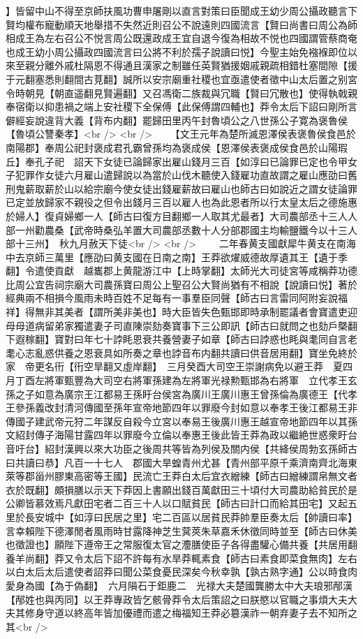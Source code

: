 】皆留中山不得至京師扶風功曹申屠剛以直言對策曰臣聞成王幼少周公攝政聽言下賢均權布寵動順天地舉措不失然近則召公不說遠則四國流言【賢曰尚書曰周公為師相成王為左右召公不悦言周公既還政成王宜自退今復為相故不悦也四國謂管蔡商奄也成王幼小周公攝政四國流言曰公將不利於孺子說讀曰悦】今聖主始免襁褓即位以來至親分離外戚杜隔恩不得通且漢家之制雖任英賢猶援姻戚親疏相錯杜塞間隙【援于元翻塞悉則翻間古莧翻】誠所以安宗廟重社稷也宜亟遣使者徵中山太后置之别宮令時朝見【朝直遥翻見賢遍翻】又召馮衛二族裁與冗職【賢曰冗散也】使得執戟親奉宿衛以抑患禍之端上安社稷下全保傅【此保傅謂四輔也】莽令太后下詔曰剛所言僻經妄說違背大義【背布内翻】罷歸田里丙午封魯頃公之八世孫公子寛為褒魯侯【魯頃公讐秦孝】<br />
<br />
　　【文王元年為楚所滅恩澤侯表褒魯侯食邑於南陽郡】奉周公祀封褒成君孔霸曾孫均為褒成侯【恩澤侯表褒成侯食邑於山陽瑕丘】奉孔子祀　詔天下女徒已論歸家出雇山錢月三百【如淳曰已論罪已定也令甲女子犯罪作女徒六月雇山遣歸說以為當於山伐木聽使入錢雇功直故謂之雇山應劭曰舊刑鬼薪取薪於山以給宗廟今使女徒出錢雇薪故曰雇山也師古曰如說近之謂女徒論罪已定並放歸家不親役之但令出錢月三百以雇人也為此恩者所以行太皇太后之德施惠於婦人】復貞婦鄉一人【師古曰復方目翻鄉一人取其尤最者】大司農部丞十三人人部一州勸農桑【武帝時桑弘羊置大司農部丞數十人分部郡國主均輸鹽鐵今以十三人部十三州】　秋九月赦天下徒<br />
<br />
　　二年春黄支國獻犀牛黄支在南海中去京師三萬里【應劭曰黄支國在日南之南】王莽欲燿威德故厚遺其王【遺于季翻】令遣使貢獻　越巂郡上黄龍游江中【上時掌翻】太師光大司徒宮等咸稱莽功德比周公宜告祠宗廟大司農孫寶曰周公上聖召公大賢尚猶有不相說【說讀曰悦】著於經典兩不相損今風雨未時百姓不足每有一事羣臣同聲【師古曰言雷同阿附妄說福祥】得無非其美者【謂所美非美也】時大臣皆失色甄邯即時承制罷議者會寶遣吏迎母母道病留弟家獨遣妻子司直陳崇劾奏寶事下三公即訊【師古曰就問之也劾戶槩翻下遐稼翻】寶對曰年七十誖眊恩衰共養營妻子如章【師古曰誖惑也眊與耄同自言老耄心志亂惑供養之恩衰具如所奏之章也誖音布内翻共讀曰供音居用翻】寶坐免終於家　帝更名衎【衎空旱翻又虛岸翻】　三月癸酉大司空王崇謝病免以避王莽　夏四月丁酉左將軍甄豐為大司空右將軍孫建為左將軍光禄勲甄邯為右將軍　立代孝王玄孫之子如意為廣宗王江都易王孫盱台侯宮為廣川王廣川惠王曾孫倫為廣德王【代孝王參孫義改封清河傳國至孫年宣帝地節四年以罪廢今封如意以奉孝王後江都易王非傳國子建武帝元狩二年謀反自殺今立宮以奉易王後廣川惠王越宣帝地節四年以其孫文紹封傳子海陽甘露四年以罪廢今立倫以奉惠王後此皆王莽為政以繼絶世惑衆盱台音吁台】紹封漢興以來大功臣之後周共等皆為列侯及關内侯【共絳侯周勃玄孫師古曰共讀曰恭】凡百一十七人　郡國大旱蝗青州尤甚【青州部平原千乘濟南齊北海東萊等郡甾州膠東高密等王國】民流亡王莽白太后宜衣繒練【師古曰繒練謂帛無文者衣於既翻】頗損膳以示天下莽因上書願出錢百萬獻田三十頃付大司農助給貧民於是公卿皆慕效焉凡獻田宅者二百三十人以口賦貧民【師古曰計口而給其田宅】又起五里於長安城中【如淳曰民居之里】宅二百區以居貧民莽帥羣臣奏太后【帥讀曰率】言幸賴陛下德澤閒者風雨時甘露降神芝生蓂莢朱草嘉禾休徵同時並至【師古曰休美也徵證也】願陛下遵帝王之常服復太官之灋膳使臣子各得盡驩心備共養【共居用翻養羊尚翻】莽又令太后下詔不許每有水旱莽輒素食【師古曰素食即菜食無肉】左右以白太后太后遣使者詔莽曰聞公菜食憂民深矣今秋幸孰【孰古熟字通】公以時食肉愛身為國【為于偽翻】　六月隕石于鉅鹿二　光禄大夫楚國龔勝太中大夫琅邪邴漢【邴姓也與丙同】以王莽專政皆乞骸骨莽令太后策詔之曰朕愍以官職之事煩大夫大夫其修身守道以終高年皆加優禮而遣之梅福知王莽必簒漢祚一朝弃妻子去不知所之其<br />
